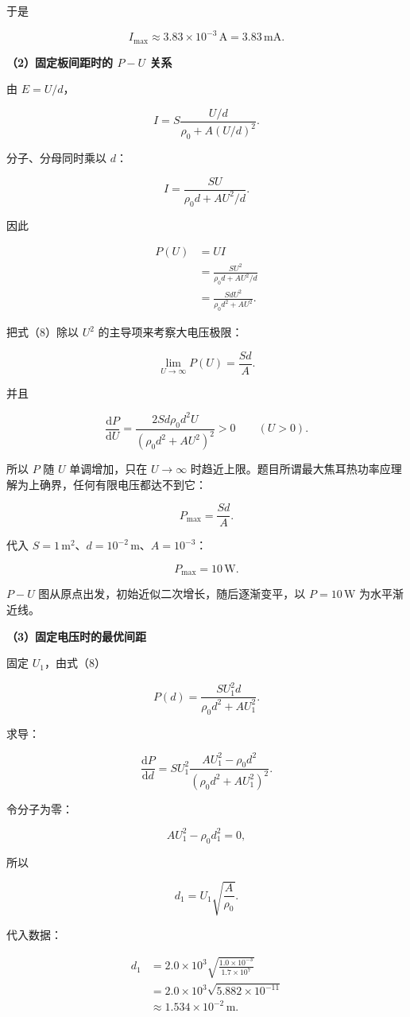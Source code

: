 \documentclass[12pt,a4paper,UTF8]{ctexart}
\begin{document}
于是

\[
\boxed{I_{\max}\approx3.83\times10^{-3}\,\mathrm A
=3.83\,\mathrm{mA}}.
\tag{6}
\]

\textbf{（2）固定板间距时的 \(P-U\) 关系}

由 \(E=U/d\)，

\[
I
=S\frac{U/d}{\rho_0+A(U/d)^2}.
\]

分子、分母同时乘以 \(d\)：

\[
I=\frac{SU}{\rho_0d+AU^2/d}.
\tag{7}
\]

因此

\[
\begin{aligned}
P(U)
&=UI\\
&=\frac{SU^2}{\rho_0d+AU^2/d}\\
&=\frac{SdU^2}{\rho_0d^2+AU^2}.
\end{aligned}
\tag{8}
\]

把式（8）除以 \(U^2\) 的主导项来考察大电压极限：

\[
\lim_{U\to\infty}P(U)
=\frac{Sd}{A}.
\tag{9}
\]

并且

\[
\frac{\mathrm dP}{\mathrm dU}
=\frac{2Sd\rho_0d^2U}
{(\rho_0d^2+AU^2)^2}>0
\qquad(U>0).
\tag{10}
\]

所以 \(P\) 随 \(U\) 单调增加，只在 \(U\to\infty\)
时趋近上限。题目所谓最大焦耳热功率应理解为上确界，任何有限电压都达不到它：

\[
P_{\max}=\frac{Sd}{A}.
\]

代入 \(S=1\,\mathrm{m^2}\)、\(d=10^{-2}\,\mathrm m\)、\(A=10^{-3}\)：

\[
\boxed{P_{\max}=10\,\mathrm W}.
\tag{11}
\]

\(P-U\) 图从原点出发，初始近似二次增长，随后逐渐变平，以
\(P=10\,\mathrm W\) 为水平渐近线。

\textbf{（3）固定电压时的最优间距}

固定 \(U_1\)，由式（8）

\[
P(d)=\frac{SU_1^2d}{\rho_0d^2+AU_1^2}.
\tag{12}
\]

求导：

\[
\frac{\mathrm dP}{\mathrm dd}
=SU_1^2
\frac{AU_1^2-\rho_0d^2}
{(\rho_0d^2+AU_1^2)^2}.
\tag{13}
\]

令分子为零：

\[
AU_1^2-\rho_0d_1^2=0,
\]

所以

\[
\boxed{d_1=U_1\sqrt{\frac A{\rho_0}}}.
\tag{14}
\]

代入数据：

\[
\begin{aligned}
d_1
&=2.0\times10^3
\sqrt{\frac{1.0\times10^{-3}}{1.7\times10^7}}\\
&=2.0\times10^3\sqrt{5.882\times10^{-11}}\\
&\approx1.534\times10^{-2}\,\mathrm m.
\end{aligned}
\]
\end{document}
